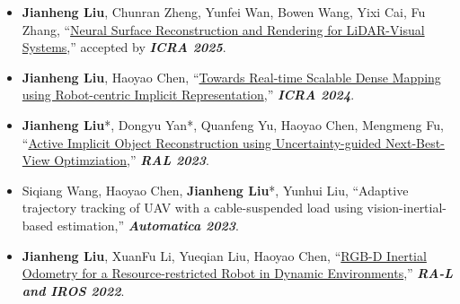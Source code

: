 %
%



\begin{itemize}
	\item \textbf{Jianheng Liu}, Chunran Zheng, Yunfei Wan, Bowen Wang, Yixi Cai, Fu Zhang, ``\href{https://github.com/hku-mars/M2Mapping}{Neural Surface Reconstruction and Rendering for LiDAR-Visual Systems},''
	accepted by \textbf{\emph{ICRA 2025}}.\\
	\vspace{-8pt}
	\item \textbf{Jianheng Liu}, Haoyao Chen, ``\href{https://github.com/HITSZ-NRSL/RIM}{Towards Real-time Scalable Dense Mapping using Robot-centric Implicit Representation},''
	\textbf{\emph{ICRA 2024}}.\\
	\vspace{-8pt}
	\item \textbf{Jianheng Liu}*, Dongyu Yan*, Quanfeng Yu, Haoyao Chen, Mengmeng Fu, ``\href{https://arxiv.org/abs/2303.16739}{Active Implicit Object Reconstruction using Uncertainty-guided Next-Best-View Optimziation},''
	\textbf{\emph{RAL 2023}}.\\
	\vspace{-8pt}
	\item Siqiang Wang, Haoyao Chen, \textbf{Jianheng Liu}*, Yunhui Liu, ``Adaptive trajectory tracking of UAV with a cable-suspended load using vision-inertial-based estimation,''
	\textbf{\emph{Automatica 2023}}.\\
	\vspace{-8pt}
	\item \textbf{Jianheng Liu}, XuanFu Li, Yueqian Liu, Haoyao Chen, ``\href{https://github.com/HITSZ-NRSL/Dynamic-VINS}{RGB-D Inertial Odometry for a Resource-restricted Robot in Dynamic Environments},''
	\textbf{\emph{RA-L and IROS 2022}}.\\
	\vspace{-8pt}

\end{itemize}
